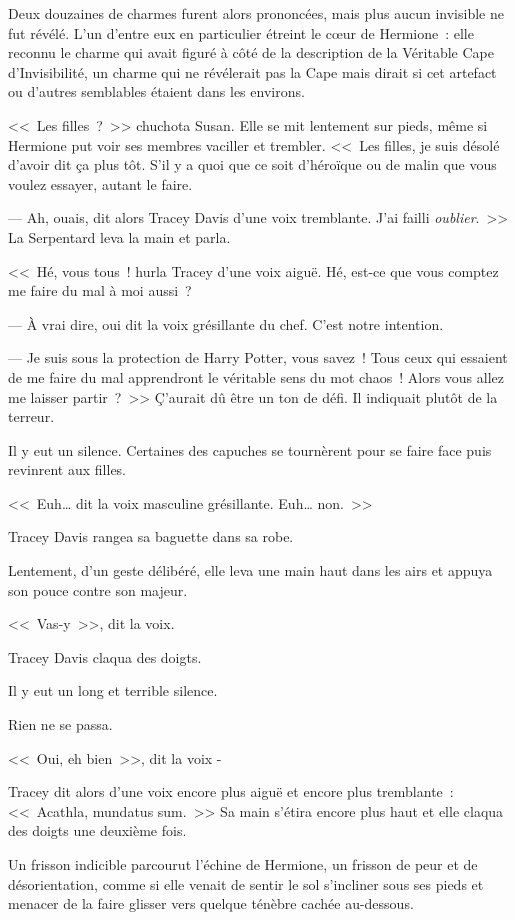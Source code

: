 Deux douzaines de charmes furent alors prononcées, mais plus aucun invisible ne fut révélé. L'un d'entre eux en particulier étreint le cœur de Hermione~: elle reconnu le charme qui avait figuré à côté de la description de la Véritable Cape d'Invisibilité, un charme qui ne révélerait pas la Cape mais dirait si cet artefact ou d'autres semblables étaient dans les environs.

<<~Les filles~?~>> chuchota Susan. Elle se mit lentement sur pieds, même si Hermione put voir ses membres vaciller et trembler. <<~Les filles, je suis désolé d'avoir dit ça plus tôt. S'il y a quoi que ce soit d'héroïque ou de malin que vous voulez essayer, autant le faire.

--- Ah, ouais, dit alors Tracey Davis d'une voix tremblante. J'ai failli \emph{oublier}.~>> La Serpentard leva la main et parla.

<<~Hé, vous tous~! hurla Tracey d'une voix aiguë. Hé, est-ce que vous comptez me faire du mal à moi aussi~?

--- À vrai dire, oui dit la voix grésillante du chef. C'est notre intention.

--- Je suis sous la protection de Harry Potter, vous savez~! Tous ceux qui essaient de me faire du mal apprendront le véritable sens du mot chaos~! Alors vous allez me laisser partir~?~>> Ç'aurait dû être un ton de défi. Il indiquait plutôt de la terreur.

Il y eut un silence. Certaines des capuches se tournèrent pour se faire face puis revinrent aux filles.

<<~Euh… dit la voix masculine grésillante. Euh… non.~>>

Tracey Davis rangea sa baguette dans sa robe.

Lentement, d'un geste délibéré, elle leva une main haut dans les airs et appuya son pouce contre son majeur.

<<~Vas-y~>>, dit la voix.

Tracey Davis claqua des doigts.

Il y eut un long et terrible silence.

Rien ne se passa.

<<~Oui, eh bien~>>, dit la voix -

Tracey dit alors d'une voix encore plus aiguë et encore plus tremblante~: <<~Acathla, mundatus sum.~>> Sa main s'étira encore plus haut et elle claqua des doigts une deuxième fois.

Un frisson indicible parcourut l'échine de Hermione, un frisson de peur et de désorientation, comme si elle venait de sentir le sol s'incliner sous ses pieds et menacer de la faire glisser vers quelque ténèbre cachée au-dessous.

